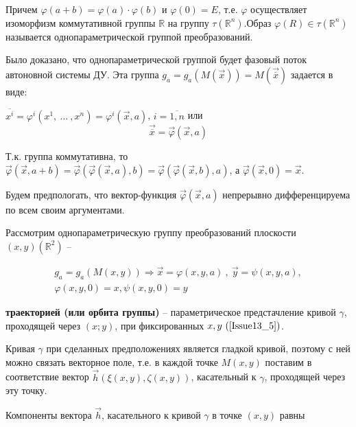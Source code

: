Причем $\varphi(a+b) = \varphi(a)\cdot \varphi(b)$ и $\varphi(0) = E$, т.е. $\varphi$ осуществляет изоморфизм коммутативной группы $\mathbb{R}$ на группу $\tau(\mathbb{R}^n)$.Образ $\varphi(R) \in \tau(\mathbb{R}^n)$ называется однопараметрической группой преобразований.

Было доказано, что однопараметрической группой будет фазовый поток автоновной системы ДУ. Эта группа $g_a = g_a(M(\vec{x})) = M(\overrightarrow{\overline{x}})$ задается в виде:

$\overline{x^i} = \varphi^i(x^1,\ \dots\ ,x^n) = \varphi^i(\vec{x}, a)$, $i = \overline{1, n}$ или 
\begin{equation}
	\overrightarrow{\overline{x}} = \vec{\varphi}(\vec{x}, a)
	\label{Issue13_4}
\end{equation}

Т.к. группа коммутативна, то $\vec{\varphi}(\vec{x}, a + b) = \vec{\varphi}(\vec{\varphi}(\vec{x}, a), b) = \vec{\varphi}(\vec{\varphi}(\vec{x}, b), a)$, а $\vec{\varphi}(\vec{x}, 0) = \vec{x}$.

Будем предпологать, что вектор-функция $\vec{\varphi}(\vec{x}, a)$ непрерывно дифференцируема по всем своим аргументами.

Рассмотрим однопараметрическую группу преобразований плоскости $(x,y)(\mathbb{R}^2)$ --

\begin{equation}
	\begin{gathered}
		g_a = g_a(M(x,y)) \Rightarrow \vec{x} = \varphi(x,y,a)\ ,\ \vec{y} = \psi(x,y,a),\\
		\varphi(x,y,0) = x, \psi(x,y,0) = y
	\end{gathered}	
	\label{Issue13_5}
\end{equation}


\begin{definition}

\textbf{траекторией (или орбита группы)} -- параметрическое предстачление кривой $\gamma$, проходящей через $(x;y)$, при фиксированных $x,y\ (\ref{Issue13_5})$.

\end{definition}


Кривая $\gamma$ при сделанных предположениях является $\textbf{гладкой кривой}$, поэтому с ней можно связать векторное поле, т.е. в каждой точке $M(x,y)$ поставим в соответствие вектор $\vec{h}(\xi(x,y), \zeta(x,y))$, касательный к $\gamma$, проходящей через эту точку.

Компоненты вектора $\vec{h}$, касательного к кривой $\gamma$ в точке $(x,y)$ равны

